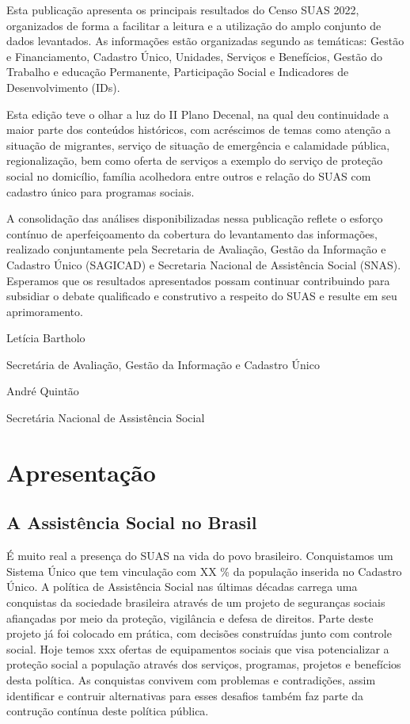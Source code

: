 \documentclass[
  brazilian]{report}
\begin{document}
Esta publicação apresenta os principais resultados do Censo SUAS 2022,
organizados de forma a facilitar a leitura e a utilização do amplo
conjunto de dados levantados. As informações estão organizadas segundo
as temáticas: Gestão e Financiamento, Cadastro Único, Unidades, Serviços
e Benefícios, Gestão do Trabalho e educação Permanente, Participação
Social e Indicadores de Desenvolvimento (IDs).

Esta edição teve o olhar a luz do II Plano Decenal, na qual deu
continuidade a maior parte dos conteúdos históricos, com acréscimos de
temas como atenção a situação de migrantes, serviço de situação de
emergência e calamidade pública, regionalização, bem como oferta de
serviços a exemplo do serviço de proteção social no domicílio, família
acolhedora entre outros e relação do SUAS com cadastro único para
programas sociais.

A consolidação das análises disponibilizadas nessa publicação reflete o
esforço contínuo de aperfeiçoamento da cobertura do levantamento das
informações, realizado conjuntamente pela Secretaria de Avaliação,
Gestão da Informação e Cadastro Único (SAGICAD) e Secretaria Nacional de
Assistência Social (SNAS). Esperamos que os resultados apresentados
possam continuar contribuindo para subsidiar o debate qualificado e
construtivo a respeito do SUAS e resulte em seu aprimoramento.

Letícia Bartholo

Secretária de Avaliação, Gestão da Informação e Cadastro Único

André Quintão

Secretária Nacional de Assistência Social

\tableofcontents

\hypertarget{apresentauxe7uxe3o}{%
\chapter*{Apresentação}\label{apresentauxe7uxe3o}}

\hypertarget{a-assistuxeancia-social-no-brasil}{%
\section*{A Assistência Social no
Brasil}\label{a-assistuxeancia-social-no-brasil}}

É muito real a presença do SUAS na vida do povo brasileiro. Conquistamos
um Sistema Único que tem vinculação com XX \% da população inserida no
Cadastro Único. A política de Assistência Social nas últimas décadas
carrega uma conquistas da sociedade brasileira através de um projeto de
seguranças sociais afiançadas por meio da proteção, vigilância e defesa
de direitos. Parte deste projeto já foi colocado em prática, com
decisões construídas junto com controle social. Hoje temos xxx ofertas
de equipamentos sociais que visa potencializar a proteção social a
população através dos serviços, programas, projetos e benefícios desta
política. As conquistas convivem com problemas e contradições, assim
identificar e contruir alternativas para esses desafios também faz parte
da contrução contínua deste política pública.
\end{document}
